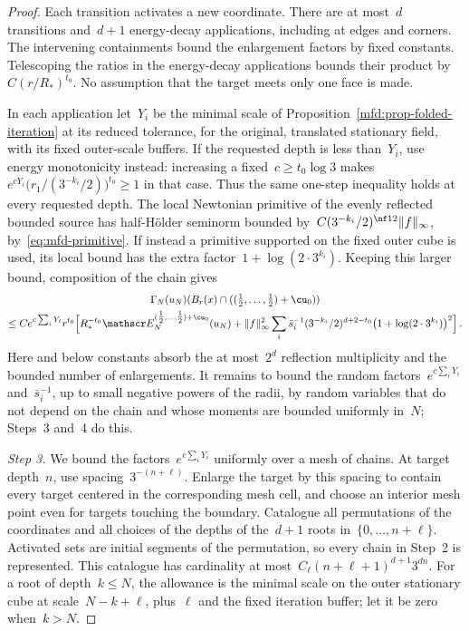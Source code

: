 \documentclass[11pt]{amsart}
\begin{document}
\begin{proof}
\smallskip

Each transition activates a new coordinate. There are at most~$d$ transitions and~$d+1$ energy-decay applications, including at edges and corners. The intervening containments bound the enlargement factors by fixed constants. Telescoping the ratios in the energy-decay applications bounds their product by~$C(r/R_*)^{t_0}$. No assumption that the target meets only one face is made.

\smallskip

In each application let~$Y_i$ be the minimal scale of Proposition~\ref{mfd:prop-folded-iteration} at its reduced tolerance, for the original, translated stationary field, with its fixed outer-scale buffers. If the requested depth is less than~$Y_i$, use energy monotonicity instead: increasing a fixed~$c\geq t_0\log3$ makes~$e^{cY_i}\bigl(r_1/(3^{-k_i}/2)\bigr)^{t_0}\geq1$ in that case. Thus the same one-step inequality holds at every requested depth. The local Newtonian primitive of the evenly reflected bounded source has half-H\"older seminorm bounded by~$C(3^{-k_i}/2)^{\nf12}\|f\|_\infty$, by~\eqref{eq:mfd-primitive}. If instead a primitive supported on the fixed outer cube is used, its local bound has the extra factor~$1+\log(2\cdot3^{k_i})$. Keeping this larger bound, composition of the chain gives
\begin{multline*}
	\Gamma_N(u_N)(B_r(x)\cap((\tfrac12,\dots,\tfrac12)+\cu_0))
	\\
	\leq C e^{c\sum_iY_i}r^{t_0}
	\Bigl[R_*^{-t_0}\mathscr E_N^{(\tfrac12,\dots,\tfrac12)+\cu_0}(u_N)
	+\|f\|_\infty^2\sum_i
	\bar s_i^{-1}(3^{-k_i}/2)^{d+2-t_0}\bigl(1+\log(2\cdot3^{k_i})\bigr)^2\Bigr]\,.
\end{multline*}
Here and below constants absorb the at most~$2^d$ reflection multiplicity and the bounded number of enlargements. It remains to bound the random factors~$e^{c\sum_iY_i}$ and~$\bar s_i^{-1}$, up to small negative powers of the radii, by random variables that do not depend on the chain and whose moments are bounded uniformly in~$N$; Steps~3 and~4 do this.

\smallskip

\emph{Step 3.} We bound the factors~$e^{c\sum_iY_i}$ uniformly over a mesh of chains. At target depth~$n$, use spacing~$3^{-(n+\ell)}$. Enlarge the target by this spacing to contain every target centered in the corresponding mesh cell, and choose an interior mesh point even for targets touching the boundary. Catalogue all permutations of the coordinates and all choices of the depths of the~$d+1$ roots in~$\{0,\dots,n+\ell\}$. Activated sets are initial segments of the permutation, so every chain in Step~2 is represented. This catalogue has cardinality at most~$C_\ell(n+\ell+1)^{d+1}3^{dn}$. For a root of depth~$k\leq N$, the allowance is the minimal scale on the outer stationary cube at scale~$N-k+\ell$, plus~$\ell$ and the fixed iteration buffer; let it be zero when~$k>N$.


\end{proof}
\end{document}
